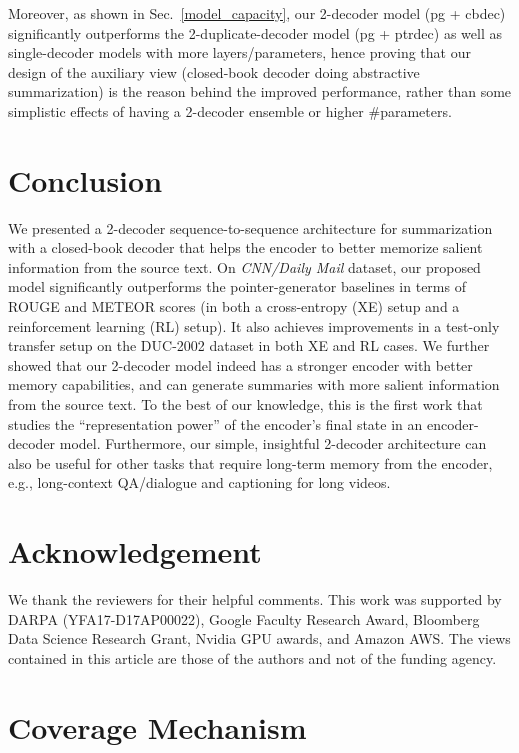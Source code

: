 \documentclass[11pt,a4paper]{article}
\begin{document}
Moreover, as shown in Sec.~\ref{model_capacity}, our 2-decoder model (pg + cbdec) significantly outperforms the 2-duplicate-decoder model (pg + ptrdec) as well as single-decoder models with more layers/parameters, hence proving that our design of the auxiliary view (closed-book decoder doing abstractive summarization) is the reason behind the improved performance, rather than some simplistic effects of having a 2-decoder ensemble or higher \#parameters.
 \section{Conclusion}
We presented a 2-decoder sequence-to-sequence architecture for summarization with a closed-book decoder that helps the encoder to better memorize salient information from the source text. On \emph{CNN/Daily Mail} dataset, our proposed model significantly outperforms the pointer-generator baselines in terms of ROUGE and METEOR scores (in both a cross-entropy (XE) setup and a reinforcement learning (RL) setup).
It also achieves improvements in a test-only transfer setup on the DUC-2002 dataset in both XE and RL cases. We further showed that our 2-decoder model indeed has a stronger encoder with better memory capabilities, and can generate summaries with more salient information from the source text.
To the best of our knowledge, this is the first work that studies the ``representation power'' of the encoder’s final state in an encoder-decoder model. 
Furthermore, our simple, insightful 2-decoder architecture can also be useful for other tasks that require long-term memory from the encoder, e.g., long-context QA/dialogue and captioning for long videos.
 \section{Acknowledgement}
We thank the reviewers for their helpful comments. This work was supported by DARPA (YFA17-D17AP00022), Google Faculty Research
Award, Bloomberg Data Science Research Grant, Nvidia GPU awards, and Amazon AWS. The views contained in
this article are those of the authors and not of the funding agency. 



\appendix
\clearpage{}
\label{sec:supplemental}

\section{Coverage Mechanism}
\end{document}
